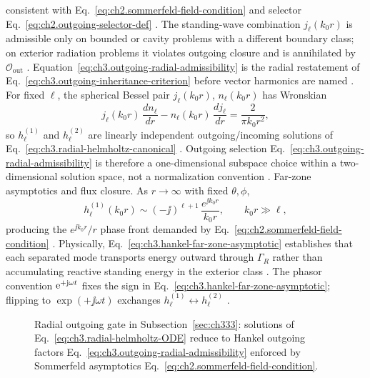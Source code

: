 consistent with Eq.~\eqref{eq:ch2.sommerfeld-field-condition} and selector
Eq.~\eqref{eq:ch2.outgoing-selector-def} \cite{stratton1941}. The standing-wave combination
\(j_{\ell}(k_{0}r)\) is admissible only on bounded or cavity problems with a different boundary class; on
exterior radiation problems it violates outgoing closure and is annihilated by \(\mathcal{O}_{\mathrm{out}}\)
\cite{jackson1999}. Equation~\eqref{eq:ch3.outgoing-radial-admissibility} is the radial restatement
of Eq.~\eqref{eq:ch3.outgoing-inheritance-criterion} before vector harmonics are named
\cite{stratton1941}.
For fixed \(\ell\), the spherical Bessel pair \(j_{\ell}(k_{0}r)\), \(n_{\ell}(k_{0}r)\) has Wronskian
\begin{equation}
\label{eq:ch3.spherical-bessel-wronskian}
j_{\ell}(k_{0}r)\,\frac{d n_{\ell}}{dr}
-n_{\ell}(k_{0}r)\,\frac{d j_{\ell}}{dr}
=\frac{2}{\pi k_{0}r^{2}},
\end{equation}
so \(h_{\ell}^{(1)}\) and \(h_{\ell}^{(2)}\) are linearly independent outgoing/incoming solutions of
Eq.~\eqref{eq:ch3.radial-helmholtz-canonical} \cite{stratton1941}. Outgoing selection
Eq.~\eqref{eq:ch3.outgoing-radial-admissibility} is therefore a one-dimensional subspace choice within a
two-dimensional solution space, not a normalization convention \cite{harrington2001}.
Far-zone asymptotics and flux closure. As \(r\to\infty\) with fixed \(\theta,\phi\),
\begin{equation}
\label{eq:ch3.hankel-far-zone-asymptotic}
h_{\ell}^{(1)}(k_{0}r)
\sim
(-\jj)^{\ell+1}\,\frac{e^{\jj k_{0}r}}{k_{0}r},
\qquad
k_{0}r\gg\ell,
\end{equation}
producing the \(e^{\jj k_{0}r}/r\) phase front demanded by Eq.~\eqref{eq:ch2.sommerfeld-field-condition}
\cite{stratton1941}. Physically, Eq.~\eqref{eq:ch3.hankel-far-zone-asymptotic} establishes that each
separated mode transports energy outward through \(\Gamma_{R}\) rather than accumulating reactive standing
energy in the exterior class \cite{harrington2001}. The phasor convention $\mathrm{e}^{+\mathrm{j}\omega t}$ fixes the
sign in Eq.~\eqref{eq:ch3.hankel-far-zone-asymptotic}; flipping to \(\exp(+\jj\omega t)\) exchanges
\(h_{\ell}^{(1)}\leftrightarrow h_{\ell}^{(2)}\) \cite{jackson1999}.
\begin{figure}[t]
\centering
{}
\caption{Radial outgoing gate in Subsection~\ref{sec:ch333}: solutions of
Eq.~\eqref{eq:ch3.radial-helmholtz-ODE} reduce to Hankel outgoing factors
Eq.~\eqref{eq:ch3.outgoing-radial-admissibility} enforced by Sommerfeld asymptotics
Eq.~\eqref{eq:ch2.sommerfeld-field-condition}.}
\label{fig:ch3.radial-outgoing-gate}
\end{figure}
